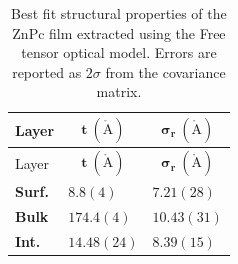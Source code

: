 \begin{longtable}[]{@{}
  >{\raggedright\arraybackslash}p{}
  >{\raggedright\arraybackslash}p{}
  >{\raggedright\arraybackslash}p{}@{}}
\caption{Best fit structural properties of the ZnPc film extracted using the Free tensor optical model. Errors are reported as \(2\sigma\) from the covariance matrix.}\label{tab:S1}\tabularnewline
\toprule\noalign{}
\begin{minipage}[b]{\linewidth}\raggedright
Layer
\end{minipage} & \begin{minipage}[b]{\linewidth}\raggedright
\[\mathbf{t}\mathbf{\ }\left( \mathbf{\mathring{\mathrm{A}}} \right)\]
\end{minipage} & \begin{minipage}[b]{\linewidth}\raggedright
\[\mathbf{\sigma}_{\mathbf{r}}\mathbf{\ }\left( \mathbf{\mathring{\mathrm{A}}} \right)\]
\end{minipage} \\
\midrule\noalign{}
\endfirsthead
\toprule\noalign{}
\begin{minipage}[b]{\linewidth}\raggedright
Layer
\end{minipage} & \begin{minipage}[b]{\linewidth}\raggedright
\[\mathbf{t}\mathbf{\ }\left( \mathbf{\mathring{\mathrm{A}}} \right)\]
\end{minipage} & \begin{minipage}[b]{\linewidth}\raggedright
\[\mathbf{\sigma}_{\mathbf{r}}\mathbf{\ }\left( \mathbf{\mathring{\mathrm{A}}} \right)\]
\end{minipage} \\
\midrule\noalign{}
\endhead
\bottomrule\noalign{}
\endlastfoot
\textbf{Surf.} & \(8.8(4)\) & \(7.21(28)\) \\
\textbf{Bulk} & \(174.4(4)\) & \(10.43(31)\) \\
\textbf{Int.} & \(14.48(24)\) & \(8.39(15)\) \\
\end{longtable}

